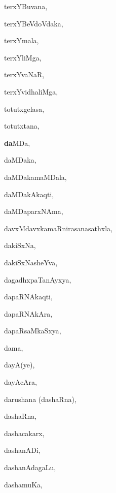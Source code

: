 \begin{multicols}{3}
{\noindent
{terxYBuvana}, \pageref{terxYBuvana}

\noindent
{terxYBeVdoVdaka}, \pageref{terxYBeVdoVdaka}

\noindent
{terxYmala}, \pageref{terxYmala}

\noindent
{terxYliMga}, \pageref{terxYliMga2}

\noindent
{terxYvaNaR}, \pageref{terxYvaNaR}

\noindent
{terxYvidhaliMga}, \pageref{terxYvidhaliMga}

\noindent
{totutxgelasa}, \pageref{totutxgelasa}

\noindent
{totutxtana}, \pageref{totutxtana}

\noindent
{{\large\textbf{da}}MDa}, \pageref{daMDa}

\noindent
{daMDaka}, \pageref{daMDaka}

\noindent
{daMDakamaMDala}, \pageref{daMDakamaMDala}

\noindent
{daMDakAkaqti}, \pageref{daMDakAkaqti}

\noindent
{daMDaparxNAma}, \pageref{daMDaparxNAma}

\noindent
{davxMdavxkamaRnirasanasathxla}, \pageref{davxMdavxkamaRnirasanasathxla}

\noindent
{dakiSxNa}, \pageref{dakiSxNa}

\noindent
{dakiSxNasheYva}, \pageref{dakiSxNasheYva}

\noindent
{dagadhxpaTanAyxya}, \pageref{dagadhxpaTanAyxya}

\noindent
{dapaRNAkaqti}, \pageref{dapaRNAkaqti}

\noindent
{dapaRNAkAra}, \pageref{dapaRNAkAra}

\noindent
{dapaRsaMkaSxya}, \pageref{dapaRsaMkaSxya}

\noindent
{dama}, \pageref{dama}

\noindent
{dayA(ye)}, \pageref{dayAye}

\noindent
{dayAcAra}, \pageref{dayAcAra}

\noindent
{darushana (dashaRna)}, \pageref{darushana dashaRna}

\noindent
{dashaRna}, \pageref{dashaRna}

\noindent
{dashacakarx}, \pageref{dashacakarx}

\noindent
{dashanADi}, \pageref{dashanADi}

\noindent
{dashanAda\-gaLu}, \pageref{dashanAdagaLu}

\noindent
{dashamuKa}, \pageref{dashamuKa}

}
\end{multicols}
